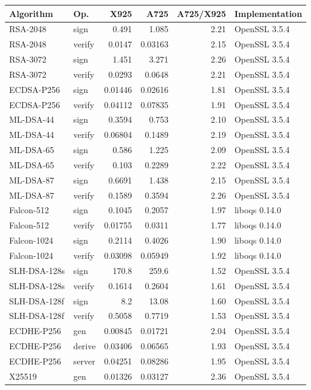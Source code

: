 \begin{tabular}{@{}llrrrl@{}}
\toprule
Algorithm & Op. & X925 & A725 & A725/X925 & Implementation \\
\midrule
RSA-2048 & sign & 0.491 & 1.085 & 2.21 & OpenSSL 3.5.4 \\
RSA-2048 & verify & 0.0147 & 0.03163 & 2.15 & OpenSSL 3.5.4 \\
RSA-3072 & sign & 1.451 & 3.271 & 2.26 & OpenSSL 3.5.4 \\
RSA-3072 & verify & 0.0293 & 0.0648 & 2.21 & OpenSSL 3.5.4 \\
ECDSA-P256 & sign & 0.01446 & 0.02616 & 1.81 & OpenSSL 3.5.4 \\
ECDSA-P256 & verify & 0.04112 & 0.07835 & 1.91 & OpenSSL 3.5.4 \\
ML-DSA-44 & sign & 0.3594 & 0.753 & 2.10 & OpenSSL 3.5.4 \\
ML-DSA-44 & verify & 0.06804 & 0.1489 & 2.19 & OpenSSL 3.5.4 \\
ML-DSA-65 & sign & 0.586 & 1.225 & 2.09 & OpenSSL 3.5.4 \\
ML-DSA-65 & verify & 0.103 & 0.2289 & 2.22 & OpenSSL 3.5.4 \\
ML-DSA-87 & sign & 0.6691 & 1.438 & 2.15 & OpenSSL 3.5.4 \\
ML-DSA-87 & verify & 0.1589 & 0.3594 & 2.26 & OpenSSL 3.5.4 \\
Falcon-512 & sign & 0.1045 & 0.2057 & 1.97 & liboqs 0.14.0 \\
Falcon-512 & verify & 0.01755 & 0.0311 & 1.77 & liboqs 0.14.0 \\
Falcon-1024 & sign & 0.2114 & 0.4026 & 1.90 & liboqs 0.14.0 \\
Falcon-1024 & verify & 0.03098 & 0.05949 & 1.92 & liboqs 0.14.0 \\
SLH-DSA-128s & sign & 170.8 & 259.6 & 1.52 & OpenSSL 3.5.4 \\
SLH-DSA-128s & verify & 0.1614 & 0.2604 & 1.61 & OpenSSL 3.5.4 \\
SLH-DSA-128f & sign & 8.2 & 13.08 & 1.60 & OpenSSL 3.5.4 \\
SLH-DSA-128f & verify & 0.5058 & 0.7719 & 1.53 & OpenSSL 3.5.4 \\
\midrule
ECDHE-P256 & gen & 0.00845 & 0.01721 & 2.04 & OpenSSL 3.5.4 \\
ECDHE-P256 & derive & 0.03406 & 0.06565 & 1.93 & OpenSSL 3.5.4 \\
ECDHE-P256 & server & 0.04251 & 0.08286 & 1.95 & OpenSSL 3.5.4 \\
X25519 & gen & 0.01326 & 0.03127 & 2.36 & OpenSSL 3.5.4 \\

\end{tabular}
